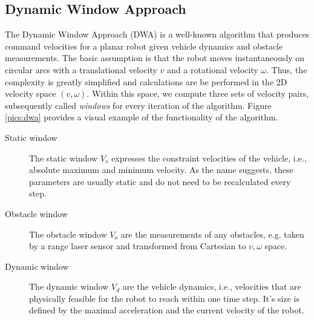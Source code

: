 
\subsection{Dynamic Window Approach}
The Dynamic Window Approach (DWA) \citep{fox1997dynamic} is a well-known algorithm that produces command velocities for a planar robot given vehicle dynamics and obstacle measurements. The basic assumption is that the robot moves instantaneously on circular arcs with a translational velocity $v$ and a rotational velocity $\omega$. Thus, the complexity is greatly simplified and calculations are be performed in the 2D velocity space $(v,\omega)$. Within this space, we compute three sets of velocity pairs,  subsequently called \emph{windows} for every iteration of the algorithm. Figure \ref{pics:dwa} provides a visual example of the functionality of the algorithm.

\begin{description}
\item[Static window] The static window $V_s$ expresses the constraint velocities of the vehicle, i.e., absolute maximum and minimum velocity. As the name suggests, these parameters are usually static and do not need to be recalculated every step.

\item[Obstacle window] The obstacle window $V_o$ are the measurements of any obstacles, e.g. taken by a range laser sensor and transformed from Cartesian to $v,\omega$ space.

\item[Dynamic window]The dynamic window $V_d$ are the vehicle dynamics, i.e., velocities that are physically feasible for the robot to reach within one time step. It's size is defined by the maximal acceleration and the current velocity of the robot.
\end{description}

